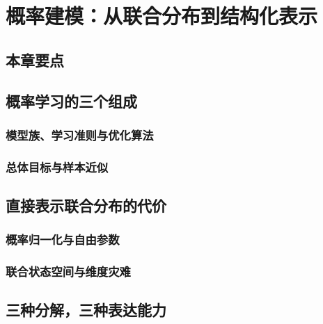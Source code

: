 \chapter{概率建模：从联合分布到结构化表示}
\label{chap:prob}

\section*{本章要点}
\contentplaceholder

\section{概率学习的三个组成}
\label{sec:prob-components}
\contentplaceholder

\subsection{模型族、学习准则与优化算法}
\label{subsec:prob-family}
\contentplaceholder

\subsection{总体目标与样本近似}
\label{subsec:prob-population-empirical}
\contentplaceholder

\section{直接表示联合分布的代价}
\label{sec:prob-joint-cost}
\contentplaceholder

\subsection{概率归一化与自由参数}
\label{subsec:prob-parameters}
\contentplaceholder

\subsection{联合状态空间与维度灾难}
\label{subsec:prob-dimensionality}
\contentplaceholder

\section{三种分解，三种表达能力}
\label{sec:prob-factorizations}
\contentplaceholder

